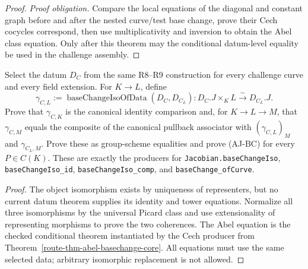 \begin{proof}
  \emph{Proof obligation.}  Compare the local equations of
  the diagonal and constant graph before and after the nested curve/test base
  change, prove their Cech cocycles correspond, then use multiplicativity and
  inversion to obtain the Abel class equation.  Only after this theorem may
  the conditional datum-level equality be used in the challenge assembly.
\end{proof}

\begin{theorem}
  \label{route-thm-phase8-basechange-coherence}
  \notready

  Select the datum \(D_C\) from the same R8--R9 construction for every challenge
  curve and every field extension.  For \(K\to L\), define
  \[
    \gamma_{C,L}:=
      \operatorname{baseChangeIsoOfData}(D_C,D_{C_L}):
      D_C.J\times_KL\xrightarrow{\sim}D_{C_L}.J.
  \]
  Prove that \(\gamma_{C,K}\) is the canonical identity comparison and, for
  \(K\to L\to M\), that \(\gamma_{C,M}\) equals the composite of the canonical
  pullback associator with \((\gamma_{C,L})_M\) and \(\gamma_{C_L,M}\).  Prove
  these as group-scheme equalities and prove (AJ-BC) for every \(P\in C(K)\).
  These are exactly the producers for \texttt{Jacobian.baseChangeIso},
  \texttt{baseChangeIso\_id}, \texttt{baseChangeIso\_comp}, and
  \texttt{baseChange\_ofCurve}.
\end{theorem}

\begin{proof}
  The object isomorphism exists by uniqueness of representers, but no current
  datum theorem supplies its identity and tower equations.  Normalize all
  three isomorphisms by the universal Picard class and use extensionality of
  representing morphisms to prove the two coherences.  The Abel equation is
  the checked conditional theorem instantiated by the Cech producer from
  Theorem~\ref{route-thm-abel-basechange-core}.  All equations must use the
  same selected data; arbitrary isomorphic replacement is not allowed.
\end{proof}

